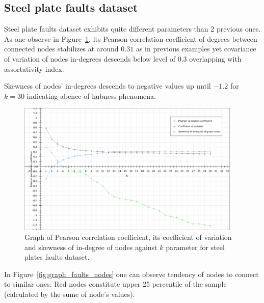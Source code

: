 \clearpage
\subsection{Steel plate faults dataset}
Steel plate faults dataset exhibits quite different parameters than 2 previous ones.
As one observe in Figure~\ref{fig:graph_faults_pearson}, its Pearson correlation coefficient of degrees between connected nodes stabilizes at around $0.31$ as in previous examples yet covariance of variation of nodes in-degrees descends below level of $0.3$ overlapping with assortativity index.

Skewness of nodes' in-degrees descends to negative values up until $-1.2$ for $k = 30$ indicating abence of hubness phenomena.

\begin{figure}[h!]
  \centering
  \captionsetup{justification=centering}
    \includegraphics[width=0.95\textwidth]{images/faults_pearson.png}
  \caption{Graph of Pearson correlation coefficient, its coefficient of variation and skewness of in-degree of nodes against $k$ parameter for steel plates faults dataset.}
  \label{fig:graph_faults_pearson}
\end{figure}


In Figure~\ref{fig:graph_faults_nodes} one can observe tendency of nodes to connect to similar ones.
Red nodes constitute upper 25 percentile of the sample (calculated by the sume of node's values).


